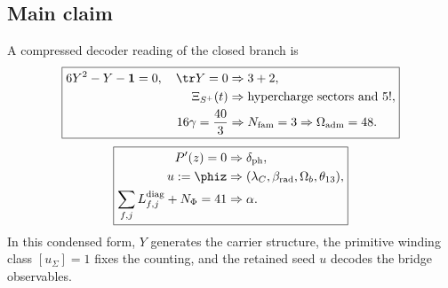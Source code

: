 \subsection{Main claim}

A compressed decoder reading of the closed branch is
\[
\boxed{
\begin{aligned}
6Y^2-Y-\mathbf 1=0,\quad \tr Y=0
&\Rightarrow 3+2,\\
\Xi_{S^+}(t)
&\Rightarrow \text{hypercharge sectors and }5!,\\
16\gamma=\frac{40}{3}
&\Rightarrow N_{\mathrm{fam}}=3\Rightarrow \Omega_{\mathrm{adm}}=48.
\end{aligned}}
\]
\[
\boxed{
\begin{aligned}
P'(z)=0
&\Rightarrow \delta_{\mathrm{ph}},\\
u:=\phiz
&\Rightarrow (\lambda_C,\beta_{\mathrm{rad}},\Omega_b,\theta_{13}),\\
\sum_{f,j}L_{f,j}^{\mathrm{diag}}+N_\Phi=41
&\Rightarrow \alpha.
\end{aligned}}
\]
In this condensed form, $Y$ generates the carrier structure, the primitive winding class
$[u_\Sigma]=1$ fixes the counting, and the retained seed $u$ decodes the bridge observables.

